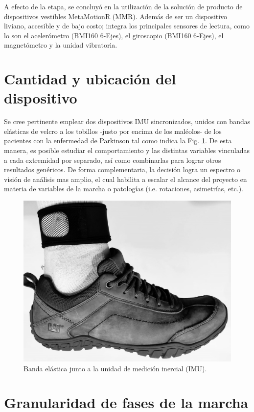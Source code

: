 A efecto de la etapa, se concluyó en la utilización de la solución de producto de dispositivos vestibles MetaMotionR (MMR). Además de ser un dispositivo liviano, accesible y de bajo costo; integra los principales sensores de lectura, como lo son el acelerómetro (BMI160 6-Ejes), el giroscopio (BMI160 6-Ejes), el magnetómetro y la unidad vibratoria. 

\section{Cantidad y ubicación del dispositivo}

Se cree pertinente emplear dos dispositivos IMU sincronizados, unidos con bandas elásticas de velcro a los tobillos -justo por encima de los maléolos- de los pacientes con la enfermedad de Parkinson tal como indica la Fig. \ref{FIG:foot_strap}. De esta manera, es posible estudiar el comportamiento y las distintas variables vinculadas a cada extremidad por separado, así como combinarlas para lograr otros resultados genéricos. De forma complementaria, la decisión logra un espectro o visión de análisis mas amplio, el cual habilita a escalar el alcance del proyecto en materia de variables de la marcha o patologías (i.e. rotaciones, asimetrías, etc.).

\begin{figure}[h!]
\centering
\includegraphics[clip,width=0.78\columnwidth]{TESIS/imagenes/img/footstrap.jpeg}
\caption{Banda elástica junto a la unidad de medición inercial (IMU).}
\label{FIG:foot_strap}
\end{figure}

\section{Granularidad de fases de la marcha} \label{section:partition-cycle}


